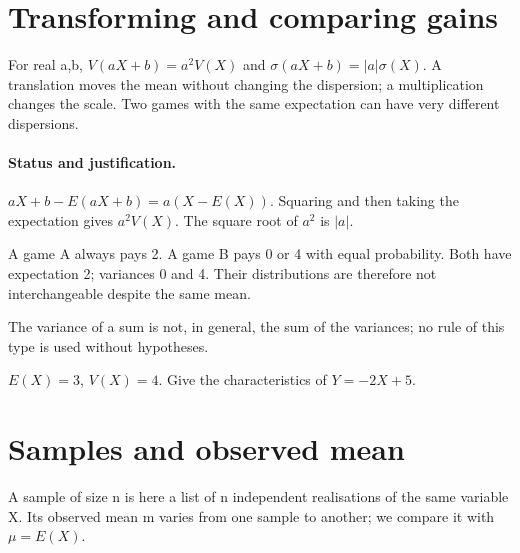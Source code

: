\section{Transforming and comparing gains}\label{C08-U4}
\begin{keypoint}
For real a,b, $V(aX+b)=a^2V(X)$ and $\sigma(aX+b)=|a|\sigma(X)$. A translation moves the mean without changing the dispersion; a multiplication changes the scale. Two games with the same expectation can have very different dispersions.
\end{keypoint}
\paragraph{Status and justification.} $aX+b-E(aX+b)=a(X-E(X))$. Squaring and then taking the expectation gives $a^2V(X)$. The square root of $a^2$ is $|a|$.
\begin{example}A game A always pays 2. A game B pays 0 or 4 with equal probability. Both have expectation 2; variances 0 and 4. Their distributions are therefore not interchangeable despite the same mean.\end{example}\label{C08-EX4}
\begin{pitfall}The variance of a sum is not, in general, the sum of the variances; no rule of this type is used without hypotheses.\end{pitfall}
\begin{application}$E(X)=3$, $V(X)=4$. Give the characteristics of $Y=-2X+5$.\end{application}\label{C08-AP4}
\section{Samples and observed mean}\label{C08-U5}
\begin{keypoint}
A sample of size n is here a list of n independent realisations of the same variable X. Its observed mean m varies from one sample to another; we compare it with $\mu=E(X)$.
\end{keypoint}
